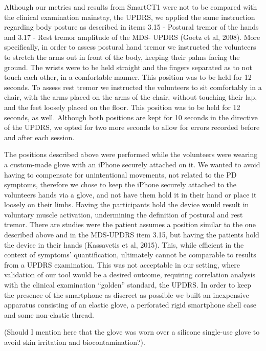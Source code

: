 Although our metrics and results from \gls{SmartCT1} were not to be compared with the clinical examination mainstay, the \gls{UPDRS}, we applied the same instruction regarding body posture as described in items 3.15 - Postural tremor of the hands and 3.17 - Rest tremor amplitude of the \gls{MDS}- \gls{UPDRS} (Goetz et al, 2008). More specifically, in order to assess postural hand tremor we instructed the volunteers to stretch the arms out in front of the body, keeping their palms facing the ground. The wrists were to be held straight and the fingers separated as to not touch each other, in a comfortable manner. This position was to be held for 12 seconds. To assess rest tremor we instructed the volunteers to sit comfortably in a chair, with the arms placed on the arms of the chair, without touching their lap, and the feet loosely placed on the floor. This position was to be held for 12 seconds, as well. Although both positions are kept for 10 seconds in the directive of the \gls{UPDRS}, we opted for two more seconds to allow for errors recorded before and after each session. 

The positions described above were performed while the volunteers were wearing a custom-made glove with an iPhone securely attached on it. We wanted to avoid having to compensate for unintentional movements, not related to the \gls{PD} symptoms, therefore we chose to keep the iPhone securely attached to the volunteers hands via a glove, and not have them hold it in their hand or place it loosely on their limbs. Having the participants hold the device would result in voluntary muscle activation, undermining the definition of postural and rest tremor. There are studies were the patient assumes a position similar to the one described above and in the \gls{MDS}-\gls{UPDRS} item 3.15, but having the patients hold the device in their hands (Kassavetis et al, 2015). This, while efficient in the context of symptoms' quantification, ultimately cannot be comparable to results from a \gls{UPDRS} examination. This was not acceptable in our setting, where validation of our tool would be a desired outcome, requiring correlation analysis with the clinical examination ``golden'' standard, the \gls{UPDRS}. 
In order to keep the presence of the smartphone as discreet as possible we built an inexpensive apparatus consisting of an elastic glove, a perforated rigid smartphone shell case and some non-elastic thread. 

(\textcolor{BurntOrange}{Should I mention here that the glove was worn over a silicone single-use glove to avoid skin irritation and biocontamination?}). 

